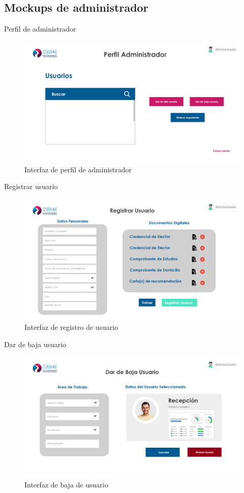\documentclass[12pt,letterpaper]{article}
\begin{document}
        \subsection{Mockups de administrador}
        Perfil de administrador
            \begin{figure}[H]
                \centering
                \includegraphics [scale=0.2]{adm_perfil}
                \caption{Interfaz de perfil de administrador}
            \end{figure}
        Registrar usuario
            \begin{figure}[H]
                \centering
                \includegraphics [scale=0.2]{adm_reg_usuario}
                \caption{Interfaz de registro de usuario}
            \end{figure}
        Dar de baja usuario
            \begin{figure}[H]
                \centering
                \includegraphics [scale=0.2]{adm_baja_usuario}
                \caption{Interfaz de baja de usuario}
            \end{figure}
\end{document}
